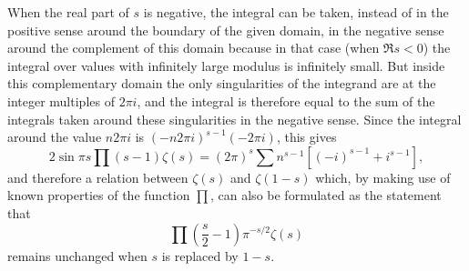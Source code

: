 When the real part of $s$ is negative, the integral can be taken, instead
of in the positive sense around the boundary of the given domain, in the
negative sense around the complement of this domain because in that case
(when $\Re s < 0$) the integral over values with infinitely large modulus
is infinitely small. But inside this complementary domain the only singularities
of the integrand are at the integer multiples of $2\pi i$, and the integral 
is therefore equal to the sum of the integrals taken around these singularities
in the negative sense. Since the integral around the value $n2\pi i$ is
$(-n2\pi i)^{s-1}(-2\pi i)$, this gives
%
\[
2\sin\pi s\prod(s-1)\zeta(s) = (2\pi)^s\sum n^{s-1}[(-i)^{s-1} + i^{s-1}],
\]
%
and therefore a relation between $\zeta(s)$ and $\zeta(1-s)$ which, by making
use of known properties of the function $\prod$, can also be formulated as the
statement that
%
\[
\prod\left(\frac{s}{2} - 1\right)\pi^{-s/2}\zeta(s)
\]
%
remains unchanged when $s$ is replaced by $1-s$.

